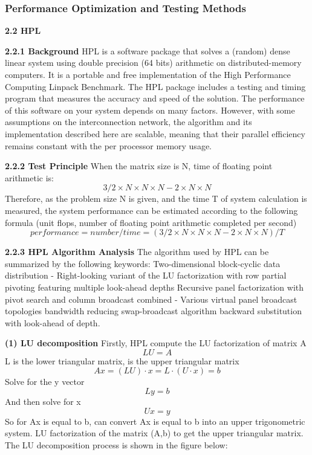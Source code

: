 \documentclass[a4paper,12pt]{article}
\begin{document}
\subsubsection{Performance Optimization and Testing Methods}
\textbf{2.2 HPL}

\textbf{2.2.1 Background}
HPL is a software package that solves a (random) dense linear system using double precision (64 bits) arithmetic on distributed-memory computers. It is a portable and free implementation of the High Performance Computing Linpack Benchmark.
The HPL package includes a testing and timing program that measures the accuracy and speed of the solution. The performance of this software on your system depends on many factors. However, with some assumptions on the interconnection network, the algorithm and its implementation described here are scalable, meaning that their parallel efficiency remains constant with the per processor memory usage.

\textbf{2.2.2 Test Principle}
When the matrix size is N, time of floating point arithmetic is:
\begin{equation*}
3/2 \times N \times N \times N - 2 \times N \times N
\end{equation*}
Therefore, as the problem size N is given, and the time T of system calculation is measured, the system performance can be estimated according to the following formula (unit flops, number of floating point arithmetic completed per second)
\begin{equation*}
performance = number/time = (3/2 \times N \times N \times N - 2 \times N \times N) / T
\end{equation*}

\textbf{2.2.3 HPL Algorithm Analysis}
The algorithm used by HPL can be summarized by the following keywords: Two-dimensional block-cyclic data distribution - Right-looking variant of the LU factorization with row partial pivoting featuring multiple look-ahead depths Recursive panel factorization with pivot search and column broadcast combined - Various virtual panel broadcast topologies bandwidth reducing swap-broadcast algorithm backward substitution with look-ahead of depth.

\textbf{(1) LU decomposition}
Firstly, HPL compute the LU factorization of matrix A
\begin{equation*}
LU=A
\end{equation*}
L is the lower triangular matrix, is the upper triangular matrix
\begin{equation*}
Ax=(LU) \cdot x=L \cdot (U \cdot x)=b
\end{equation*}
Solve for the y vector
\begin{equation*}
Ly=b
\end{equation*}
And then solve for x
\begin{equation*}
U x=y
\end{equation*}
So for Ax is equal to b, can convert Ax is equal to b into an upper trigonometric system. LU factorization of the matrix (A,b) to get the upper triangular matrix. The LU decomposition process is shown in the figure below:
\end{document}
